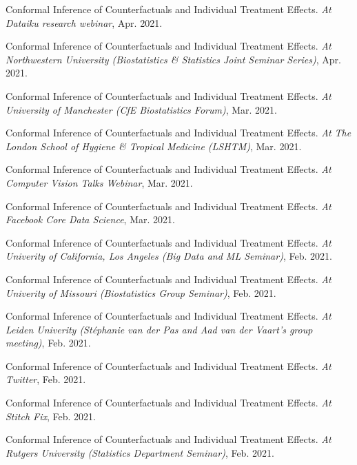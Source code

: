 \documentclass{article}
\begin{document}
\vspace{2mm}
Conformal Inference of Counterfactuals and Individual Treatment Effects. \emph{At Dataiku research webinar}, Apr. 2021.

\vspace{2mm}
Conformal Inference of Counterfactuals and Individual Treatment Effects. \emph{At Northwestern University (Biostatistics \& Statistics Joint Seminar Series)}, Apr. 2021.

\vspace{2mm}
Conformal Inference of Counterfactuals and Individual Treatment Effects. \emph{At University of Manchester (CfE Biostatistics Forum)}, Mar. 2021.

\vspace{2mm}
Conformal Inference of Counterfactuals and Individual Treatment Effects. \emph{At The London School of Hygiene \& Tropical Medicine (LSHTM)}, Mar. 2021.

\vspace{2mm}
Conformal Inference of Counterfactuals and Individual Treatment Effects. \emph{At Computer Vision Talks Webinar}, Mar. 2021.

\vspace{2mm}
Conformal Inference of Counterfactuals and Individual Treatment Effects. \emph{At Facebook Core Data Science}, Mar. 2021.

\vspace{2mm}
Conformal Inference of Counterfactuals and Individual Treatment Effects. \emph{At Univerity of California, Los Angeles (Big Data and ML Seminar)}, Feb. 2021.

\vspace{2mm}
Conformal Inference of Counterfactuals and Individual Treatment Effects. \emph{At Univerity of Missouri (Biostatistics Group Seminar)}, Feb. 2021.

\vspace{2mm}
Conformal Inference of Counterfactuals and Individual Treatment Effects. \emph{At Leiden Univerity (Stéphanie van der Pas and Aad van der Vaart's group meeting)}, Feb. 2021.

\vspace{2mm}
Conformal Inference of Counterfactuals and Individual Treatment Effects. \emph{At Twitter}, Feb. 2021.

\vspace{2mm}
Conformal Inference of Counterfactuals and Individual Treatment Effects. \emph{At Stitch Fix}, Feb. 2021.

\vspace{2mm}
Conformal Inference of Counterfactuals and Individual Treatment Effects. \emph{At Rutgers University (Statistics Department Seminar)}, Feb. 2021.
\end{document}
